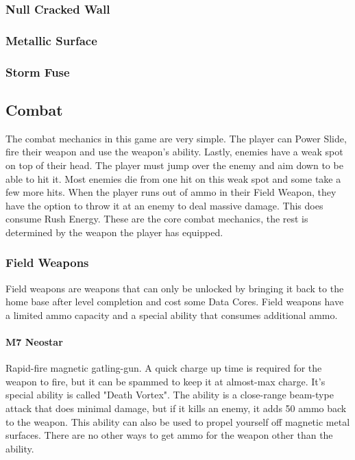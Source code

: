 \documentclass[12pt]{article}
\begin{document}
\subsubsection{Null Cracked Wall}

\subsubsection{Metallic Surface}

\subsubsection{Storm Fuse}

\subsection{Combat}

The combat mechanics in this game are very simple. The player can Power Slide, fire their weapon and use the weapon's ability. Lastly, enemies have a weak spot on top of their head. The player must jump over the enemy and aim down to be able to hit it. Most enemies die from one hit on this weak spot and some take a few more hits. When the player runs out of ammo in their Field Weapon, they have the option to throw it at an enemy to deal massive damage. This does consume Rush Energy.
These are the core combat mechanics, the rest is determined by the weapon the player has equipped.

\subsubsection{Field Weapons}

Field weapons are weapons that can only be unlocked by bringing it back to the home base after level completion and cost some Data Cores. Field weapons have a limited ammo capacity and a special ability that consumes additional ammo. 

\paragraph{M7 Neostar}

Rapid-fire magnetic gatling-gun. A quick charge up time is required for the weapon to fire, but it can be spammed to keep it at almost-max charge. It's special ability is called "Death Vortex". The ability is a close-range beam-type attack that does minimal damage, but if it kills an enemy, it adds 50 ammo back to the weapon. This ability can also be used to propel yourself off magnetic metal surfaces. There are no other ways to get ammo for the weapon other than the ability.
\end{document}
